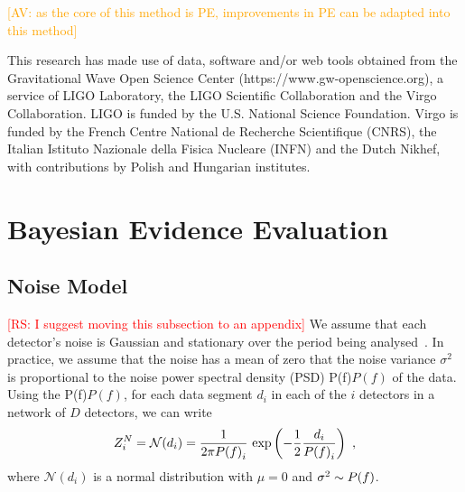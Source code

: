 \documentclass[%
 nofootinbib,
 amsmath,amssymb,
 aps,
 twocolumn
]{revtex4-2}
\newcommand{\mathcmd}[1]{{\sc \relax\ifmmode#1\else $#1$\fi}\xspace}
\newcommand{\psd}{\mathcmd{P(f)}}
\newcommand{\av}[1]{\textcolor{orange}{[AV: #1]}}
\newcommand{\rs}[1]{\textcolor{red}{[RS: #1]}}
\begin{document}
\av{as the core of this method is PE, improvements in PE can be adapted into this method}


\begin{acknowledgments}

This research has made use of data, software and/or web tools obtained from the Gravitational Wave Open Science Center (https://www.gw-openscience.org), a service of LIGO Laboratory, the LIGO Scientific Collaboration and the Virgo Collaboration. LIGO is funded by the U.S. National Science Foundation. Virgo is funded by the French Centre National de Recherche Scientifique (CNRS), the Italian Istituto Nazionale della Fisica Nucleare (INFN) and the Dutch Nikhef, with contributions by Polish and Hungarian institutes.


\end{acknowledgments}

\appendix



\section{Bayesian Evidence Evaluation}
\subsection{Noise Model}
\rs{I suggest moving this subsection to an appendix}
We assume that each detector's noise is Gaussian and stationary over the period being analysed~\cite{ligo_psd}. In practice, we assume that the noise has a mean of zero that the noise variance $\sigma^2$ is proportional to the noise power spectral density (PSD) \psd of the data. Using the \psd, for each data segment $d_i$ in each of the $i$ detectors in a network of $D$ detectors, we can write 
\begin{equation}
\label{eq:zn}
Z^N_i = \mathcal{N}(d_i) = \frac{1}{2\pi \psd_i} \ \text{exp}\left(-\frac{1}{2} \frac{d_i}{\psd_i} \right) \ ,
\end{equation}
where $\mathcal{N}(d_i)$ is a normal distribution with $\mu=0$ and $\sigma^2\sim \psd$. 
\end{document}
